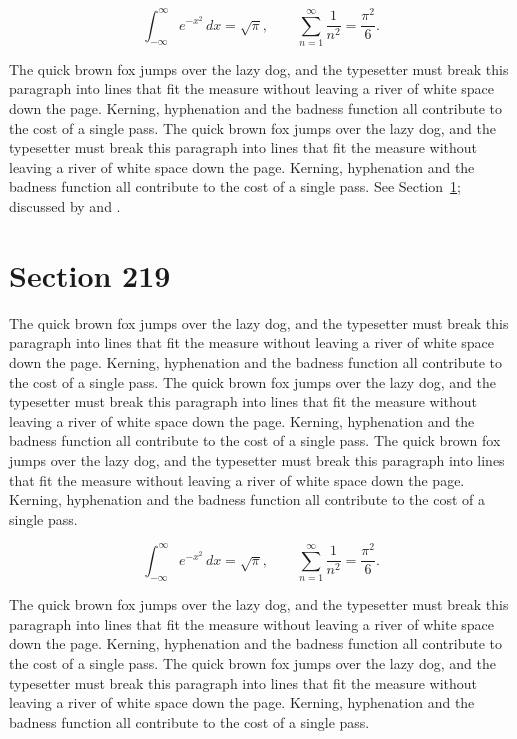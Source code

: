 \documentclass{article}
\begin{document}
\begin{equation}\label{eq:218}
\int_{-\infty}^{\infty} e^{-x^{2}}\,dx = \sqrt{\pi}, \qquad
\sum_{n=1}^{\infty} \frac{1}{n^{2}} = \frac{\pi^{2}}{6}.
\end{equation}

The quick brown fox jumps over the lazy dog, and the typesetter must break this paragraph into lines that fit the measure without leaving a river of white space down the page. Kerning, hyphenation and the badness function all contribute to the cost of a single pass. The quick brown fox jumps over the lazy dog, and the typesetter must break this paragraph into lines that fit the measure without leaving a river of white space down the page. Kerning, hyphenation and the badness function all contribute to the cost of a single pass. 
See Section~\ref{sec:219}; discussed by \textcite{k4} and \textcite{l1}.
\section{Section 219}
\label{sec:219}
The quick brown fox jumps over the lazy dog, and the typesetter must break this paragraph into lines that fit the measure without leaving a river of white space down the page. Kerning, hyphenation and the badness function all contribute to the cost of a single pass. The quick brown fox jumps over the lazy dog, and the typesetter must break this paragraph into lines that fit the measure without leaving a river of white space down the page. Kerning, hyphenation and the badness function all contribute to the cost of a single pass. The quick brown fox jumps over the lazy dog, and the typesetter must break this paragraph into lines that fit the measure without leaving a river of white space down the page. Kerning, hyphenation and the badness function all contribute to the cost of a single pass. 

\begin{equation}\label{eq:219}
\int_{-\infty}^{\infty} e^{-x^{2}}\,dx = \sqrt{\pi}, \qquad
\sum_{n=1}^{\infty} \frac{1}{n^{2}} = \frac{\pi^{2}}{6}.
\end{equation}

The quick brown fox jumps over the lazy dog, and the typesetter must break this paragraph into lines that fit the measure without leaving a river of white space down the page. Kerning, hyphenation and the badness function all contribute to the cost of a single pass. The quick brown fox jumps over the lazy dog, and the typesetter must break this paragraph into lines that fit the measure without leaving a river of white space down the page. Kerning, hyphenation and the badness function all contribute to the cost of a single pass. 
\end{document}
